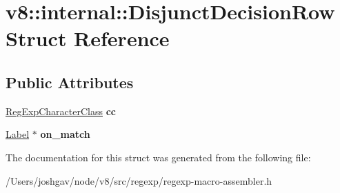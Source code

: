 \hypertarget{structv8_1_1internal_1_1_disjunct_decision_row}{}\section{v8\+:\+:internal\+:\+:Disjunct\+Decision\+Row Struct Reference}
\label{structv8_1_1internal_1_1_disjunct_decision_row}
\subsection*{Public Attributes}
\begin{DoxyCompactItemize}
\item 
\hyperlink{classv8_1_1internal_1_1_reg_exp_character_class}{Reg\+Exp\+Character\+Class} {\bfseries cc}\hypertarget{structv8_1_1internal_1_1_disjunct_decision_row_a00ccd419406cacc950f0bebaec37b155}{}\label{structv8_1_1internal_1_1_disjunct_decision_row_a00ccd419406cacc950f0bebaec37b155}

\item 
\hyperlink{classv8_1_1internal_1_1_label}{Label} $\ast$ {\bfseries on\+\_\+match}\hypertarget{structv8_1_1internal_1_1_disjunct_decision_row_ace085ac637c04fa532662369dcede45e}{}\label{structv8_1_1internal_1_1_disjunct_decision_row_ace085ac637c04fa532662369dcede45e}

\end{DoxyCompactItemize}


The documentation for this struct was generated from the following file\+:\begin{DoxyCompactItemize}
\item 
/\+Users/joshgav/node/v8/src/regexp/regexp-\/macro-\/assembler.\+h\end{DoxyCompactItemize}
